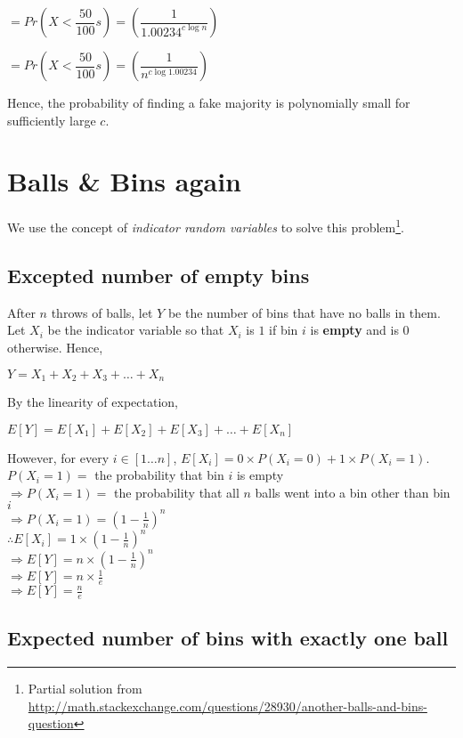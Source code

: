 \documentclass{article}
\begin{document}
$ = Pr(X < \dfrac{50}{100}s) = \left(\dfrac{1}{1.00234^{c\log{n}}}\right)$

$ = Pr(X < \dfrac{50}{100}s) = \left(\dfrac{1}{n^{c\log{1.00234}}}\right)$

Hence, the probability of finding a fake majority is polynomially small for sufficiently large $c$.

\clearpage

\section{Balls \& Bins again}

We use the concept of \textit{indicator random variables} to solve
this problem\footnote{Partial solution from
  \url{http://math.stackexchange.com/questions/28930/another-balls-and-bins-question}}.

\subsection{Excepted number of empty bins}

After $n$ throws of balls, let $Y$ be the number of bins that have no
balls in them. Let $X_i$ be the indicator variable so that $X_i$ is
$1$ if bin $i$ is \textbf{empty} and is $0$ otherwise. Hence, 

$Y = X_1 + X_2 + X_3 + \ldots{} + X_n$

By the linearity of expectation,

$E[Y] = E[X_1] + E[X_2] + E[X_3] + \ldots{} + E[X_n]$

However, for every $i \in [1\ldots{}n]$, $E[X_i] = 0 \times P(X_i = 0)
+ 1 \times P(X_i = 1)$.\\
$P(X_i = 1) = $ the probability that bin $i$ is empty\\
$\Rightarrow P(X_i = 1) = $ the probability that all $n$ balls went
into a bin other than bin $i$\\
$\Rightarrow P(X_i = 1) = (1 - \frac{1}{n})^n$\\
$\therefore E[X_i] = 1 \times (1 - \frac{1}{n})^n$\\
$\Rightarrow E[Y] = n \times (1 - \frac{1}{n})^n$\\
$\Rightarrow E[Y] = n \times \frac{1}{e}$\\
$\Rightarrow E[Y] = \frac{n}{e}$


\subsection{Expected number of bins with exactly one ball}
\end{document}

